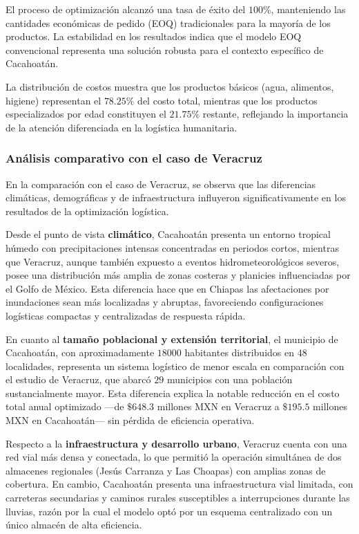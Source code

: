 \documentclass[
  spanish,
  us-letterpaper,
  DIV=11,
  numbers=noendperiod]{scrreprt}
\numberwithin{equation}{section}
\begin{document}
El proceso de optimización alcanzó una tasa de éxito del \(100\%\),
manteniendo las cantidades económicas de pedido (EOQ) tradicionales para
la mayoría de los productos. La estabilidad en los resultados indica que
el modelo EOQ convencional representa una solución robusta para el
contexto específico de Cacahoatán.

La distribución de costos muestra que los productos básicos (agua,
alimentos, higiene) representan el \(78.25\%\) del costo total, mientras
que los productos especializados por edad constituyen el \(21.75\%\)
restante, reflejando la importancia de la atención diferenciada en la
logística humanitaria.

\subsubsection{Análisis comparativo con el caso de
Veracruz}\label{anuxe1lisis-comparativo-con-el-caso-de-veracruz}

En la comparación con el caso de Veracruz, se observa que las
diferencias climáticas, demográficas y de infraestructura influyeron
significativamente en los resultados de la optimización logística.

Desde el punto de vista \textbf{climático}, Cacahoatán presenta un
entorno tropical húmedo con precipitaciones intensas concentradas en
periodos cortos, mientras que Veracruz, aunque también expuesto a
eventos hidrometeorológicos severos, posee una distribución más amplia
de zonas costeras y planicies influenciadas por el Golfo de México. Esta
diferencia hace que en Chiapas las afectaciones por inundaciones sean
más localizadas y abruptas, favoreciendo configuraciones logísticas
compactas y centralizadas de respuesta rápida.

En cuanto al \textbf{tamaño poblacional y extensión territorial}, el
municipio de Cacahoatán, con aproximadamente \(18 000\) habitantes
distribuidos en \(48\) localidades, representa un sistema logístico de
menor escala en comparación con el estudio de Veracruz, que abarcó
\(29\) municipios con una población sustancialmente mayor. Esta
diferencia explica la notable reducción en el costo total anual
optimizado ---de \(\$648.3\) millones MXN en Veracruz a \(\$195.5\)
millones MXN en Cacahoatán--- sin pérdida de eficiencia operativa.

Respecto a la \textbf{infraestructura y desarrollo urbano}, Veracruz
cuenta con una red vial más densa y conectada, lo que permitió la
operación simultánea de dos almacenes regionales (Jesús Carranza y Las
Choapas) con amplias zonas de cobertura. En cambio, Cacahoatán presenta
una infraestructura vial limitada, con carreteras secundarias y caminos
rurales susceptibles a interrupciones durante las lluvias, razón por la
cual el modelo optó por un esquema centralizado con un único almacén de
alta eficiencia.
\end{document}
